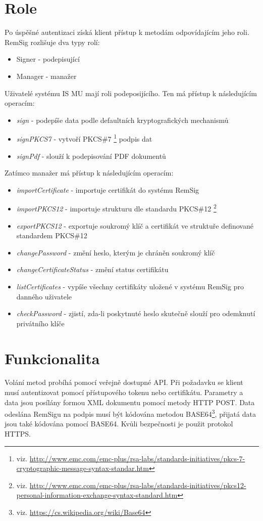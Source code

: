 \documentclass[]{fithesis3}
\begin{document}
	\section{Role} 	
	Po úspěšné autentizaci získá klient přístup k metodám odpovídajícím jeho roli. RemSig rozlišuje 		dva typy rolí:
	\begin{itemize}
		\item Signer - podepisující
		\item Manager - manažer
	\end{itemize}
	\newpage
	Uživatelé systému IS MU mají roli podeposijícího. Ten má přístup k následujícím operacím:
	\begin{itemize}
		\item \textit{sign} - podepíše data podle defaultních kryptografických mechanismů
		\item \textit{signPKCS7} - vytvoří PKCS\#7
			\footnote{viz. \url{http://www.emc.com/emc-plus/rsa-labs/standards-initiatives/pkcs-7-cryptographic-message-syntax-standar.htm}} podpis dat
		\item \textit{signPdf} - slouží k podepisování PDF dokumentů
	\end{itemize}
	Zatímco manažer má přístup k následujícím operacím:
	\begin{itemize}
		\item \textit{importCertificate} - importuje certifikát do systému RemSig
		\item \textit{importPKCS12} - importuje strukturu dle standardu PKCS\#12
		\footnote{viz. \url{http://www.emc.com/emc-plus/rsa-labs/standards-initiatives/pkcs12-personal-information-exchange-syntax-standard.htm}}
		\item \textit{exportPKCS12} - exportuje soukromý klíč a certifikát ve struktuře 					definované standardem PKCS\#12
		\item \textit{changePassword} - změní heslo, kterým je chráněn soukromý klíč
		\item \textit{changeCertificateStatus} - změní status certifikátu
		\item \textit{listCertificates} - vypíše všechny certifikáty uložené v systému RemSig pro 			danného uživatele
		\item \textit{checkPassword} - zjistí, zda-li poskytnuté heslo skutečně slouží pro 					odemknutí privátního klíče
	\end{itemize}

	\section{Funkcionalita}
	Volání metod probíhá pomocí veřejně dostupné API. Při požadavku se klient musí autentizovat 		pomocí přístupového tokenu nebo certifikátu. Parametry a data jsou posílány formou XML 			dokumentu pomocí metody HTTP POST. Data odeslána RemSigu na podpis musí být 				kódována metodou BASE64\footnote{viz. \url{https://cs.wikipedia.org/wiki/Base64}}, přijatá 		data jsou také kódována pomocí BASE64. Kvůli 	bezpečnosti je použit protokol HTTPS.
\end{document}
